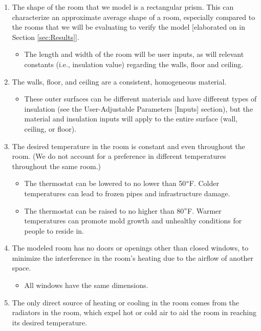 \documentclass[conference,letterpaper]{IEEEtran}
\begin{document}
\begin{enumerate}
    \item The shape of the room that we model is a rectangular prism. This can characterize an approximate average shape of a room, especially compared to the rooms that we will be evaluating to verify the model [elaborated on in Section \ref{sec:Results}]. 
    \begin{itemize}
        \item The length and width of the room will be user inputs, as will relevant constants (i.e., insulation value) regarding the walls, floor and ceiling.
    \end{itemize}
    \item The walls, floor, and ceiling are a consistent, homogeneous material.
    \begin{itemize}
        \item These outer surfaces can be different materials and have different types of insulation (see the User-Adjustable Parameters [Inputs] section), but the material and insulation inputs will apply to the entire surface (wall, ceiling, or floor).
    \end{itemize}
        \item The desired temperature in the room is constant and even throughout the room. (We do not account for a preference in different temperatures throughout the same room.)
    \begin{itemize}
        \item The thermostat can be lowered to no lower than 50$\degree$F. Colder temperatures can lead to frozen pipes and infrastructure damage. \cite{constellation}
        \item The thermostat can be raised to no higher than 80$\degree$F. Warmer temperatures can promote mold growth and unhealthy conditions for people to reside in.
    \end{itemize}
    \item The modeled room has no doors or openings other than closed windows, to minimize the interference in the room's heating due to the airflow of another space.
    \begin{itemize}
        \item All windows have the same dimensions.
    \end{itemize}
    \item The only direct source of heating or cooling in the room  comes from the radiators in the room, which expel hot or cold air to  aid the room in reaching its desired temperature.

\end{enumerate}
\end{document}
